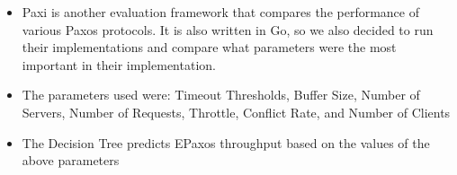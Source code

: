 \begin{itemize}
    \item Paxi is another evaluation framework that compares the performance of various Paxos protocols. It is
    also written in Go, so we also decided to run their implementations and compare what parameters were the
    most important in their implementation.
    \item The parameters used were: Timeout Thresholds, Buffer Size, Number of Servers, Number of Requests,
    Throttle, Conflict Rate, and Number of Clients
    \item The Decision Tree predicts EPaxos throughput based on the values of the above parameters
\end{itemize}

